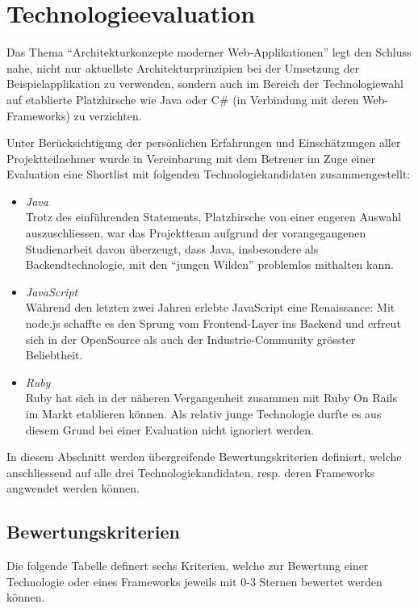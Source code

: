 \section{Technologieevaluation}
Das Thema ``Architekturkonzepte moderner Web-Applikationen'' legt den Schluss nahe, nicht nur aktuellste Architekturprinzipien bei der Umsetzung der Beispielapplikation zu verwenden, sondern auch im Bereich der Technologiewahl auf etablierte Platzhirsche wie Java oder C\# (in Verbindung mit deren Web-Frameworks) zu verzichten.

Unter Berücksichtigung der persönlichen Erfahrungen und Einschätzungen aller Projektteilnehmer wurde in Vereinbarung mit dem Betreuer im Zuge einer Evaluation eine Shortlist mit folgenden Technologiekandidaten zusammengestellt:

\begin{itemize}
	\item \emph{Java}\\
	Trotz des einführenden Statements, Platzhirsche von einer engeren Auswahl auszuschliessen, war das Projektteam aufgrund der vorangegangenen Studienarbeit davon überzeugt, dass Java, insbesondere als Backendtechnologie, mit den ``jungen Wilden'' problemlos mithalten kann.

	\item \emph{JavaScript}\\
	Während den letzten zwei Jahren erlebte JavaScript eine Renaissance: Mit node.js schaffte es den Sprung vom Frontend-Layer ins Backend und erfreut sich in der OpenSource als auch der Industrie-Community grösster Beliebtheit.

	\item \emph{Ruby}\\
	Ruby hat sich in der näheren Vergangenheit zusammen mit Ruby On Rails im Markt etablieren können. Als relativ junge Technologie durfte es aus diesem Grund bei einer Evaluation nicht ignoriert werden.
\end{itemize}

In diesem Abschnitt werden übergreifende Bewertungskriterien definiert, welche anschliessend auf alle drei Technologiekandidaten, resp. deren Frameworks angwendet werden können.

\newpage
\subsection{Bewertungskriterien}
Die folgende Tabelle definert sechs Kriterien, welche zur Bewertung einer Technologie oder eines Frameworks jeweils mit 0-3 Sternen bewertet werden können.

